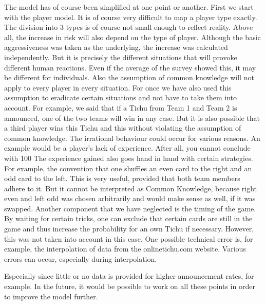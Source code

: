 The model has of course been simplified at one point or another.
First we start with the player model. It is of course very difficult to map a player type exactly. The division into 3 types is of course not small enough to reflect reality. Above all, the increase in risk will also depend on the type of player. Although the basic aggressiveness was taken as the underlying, the increase was calculated independently. But it is precisely the different situations that will provoke different human reactions. Even if the average of the survey showed this, it may be different for individuals.
Also the assumption of common knowledge will not apply to every player in every situation. For once we have also used this assumption to eradicate certain situations and not have to take them into account.
For example, we said that if a Tichu from Team 1 and Team 2 is announced, one of the two teams will win in any case. But it is also possible that a third player wins this Tichu and this without violating the assumption of common knowledge.
The irrational behaviour could occur for various reasons.
An example would be a player's lack of experience. After all, you cannot conclude with 100%
The experience gained also goes hand in hand with certain strategies. For example, the convention that one shuffles an even card to the right and an odd card to the left. This is very useful, provided that both team members adhere to it. But it cannot be interpreted as Common Knowledge, because right even and left odd was chosen arbitrarily and would make sense as well, if it was swapped.
Another component that we have neglected is the timing of the game. By waiting for certain tricks, one can exclude that certain cards are still in the game and thus increase the probability for an own Tichu if necessary. However, this was not taken into account in this case.
One possible technical error is, for example, the interpolation of data from the onlinetichu.com website. Various errors can occur, especially during interpolation.


Especially since little or no data is provided for higher announcement rates, for example.
In the future, it would be possible to work on all these points in order to improve the model further.



